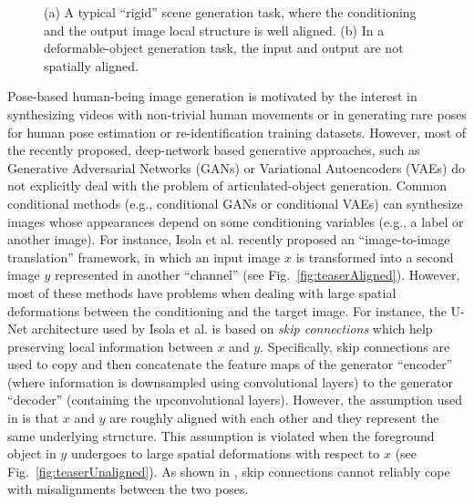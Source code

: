 \documentclass[10pt,twocolumn,letterpaper]{article}
\begin{document}
\begin{figure}[t!]
\centering
{}
\caption{(a) A typical ``rigid'' scene generation task, where the conditioning and the output image local structure is well aligned. (b) In a deformable-object  generation task, the input and output are not spatially aligned.}
\vspace{-0.5cm}
\label{fig:teaser}
\end{figure}

Pose-based human-being image  generation is motivated by the interest in synthesizing videos \cite{Walker2017pose} with non-trivial human movements or in generating rare poses  for human pose estimation \cite{Cao} or re-identification \cite{Zheng_2017_ICCV} training datasets. 
However, most of the recently proposed, deep-network based generative approaches, such as  Generative Adversarial Networks (GANs) \cite{goodfellow2014generative} or Variational Autoencoders (VAEs) 
 \cite{kingma2013auto} do not explicitly deal with the problem of articulated-object generation.
 Common conditional methods (e.g., conditional GANs or conditional VAEs) can synthesize images whose appearances depend on some conditioning variables (e.g., a label or another image). For instance, Isola et al. \cite{pix2pix2016} recently proposed an ``image-to-image translation'' framework, in which an input image $x$ is transformed into a second image $y$ represented in another ``channel'' (see Fig.~\ref{fig:teaserAligned}).
However, most of these methods have problems when dealing with large spatial deformations between the conditioning and the target image. 
For instance, 
the U-Net architecture used by  Isola et al. \cite{pix2pix2016} is based on {\em skip connections} which help preserving local information between $x$ and $y$. 
Specifically, skip connections are used to copy and then concatenate the feature maps of the generator ``encoder'' (where information is downsampled using convolutional layers) to the generator ``decoder'' (containing the upconvolutional layers).
However, the assumption used in \cite{pix2pix2016} is that $x$ and $y$ are roughly aligned with each other and they represent the same underlying structure. This assumption is violated 
when the foreground object in $y$ undergoes to large spatial deformations with respect to $x$ (see Fig.~\ref{fig:teaserUnaligned}). As shown in \cite{ma2017pose},
 skip connections  
cannot reliably cope with misalignments between the two poses.
\end{document}
